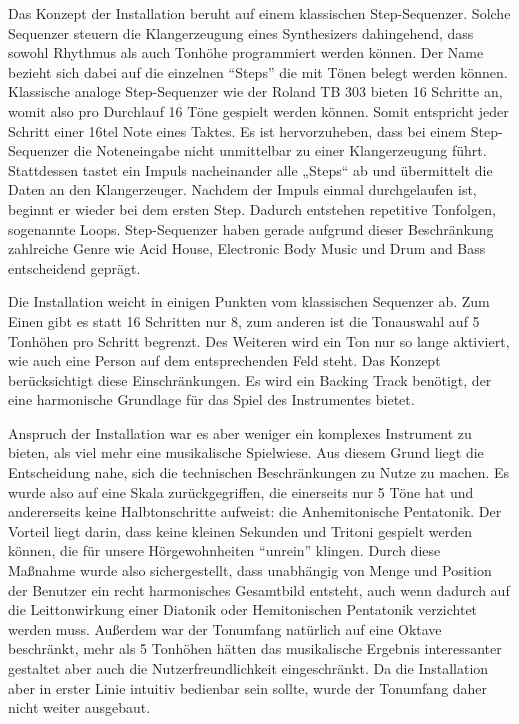 \label{sec:music}

Das Konzept der Installation beruht auf einem klassischen Step-Sequenzer. Solche Sequenzer steuern die Klangerzeugung eines Synthesizers dahingehend, dass sowohl Rhythmus als auch Tonhöhe programmiert werden können. Der Name bezieht sich dabei auf die einzelnen \enquote{Steps} die mit Tönen belegt werden können. Klassische analoge Step-Sequenzer wie der Roland TB 303 bieten 16 Schritte an, womit also pro Durchlauf 16 Töne gespielt werden können. Somit entspricht jeder Schritt einer 16tel Note eines Taktes. Es ist hervorzuheben, dass bei einem Step-Sequenzer die Noteneingabe nicht unmittelbar zu einer Klangerzeugung führt. Stattdessen tastet ein Impuls nacheinander alle „Steps“ ab und übermittelt die Daten an den Klangerzeuger. Nachdem der Impuls einmal durchgelaufen ist, beginnt er wieder bei dem ersten Step. Dadurch entstehen repetitive Tonfolgen, sogenannte Loops. Step-Sequenzer haben gerade aufgrund dieser Beschränkung zahlreiche Genre wie Acid House, Electronic Body Music und Drum and Bass entscheidend geprägt.

Die Installation weicht in einigen Punkten vom klassischen Sequenzer ab. Zum Einen gibt es statt 16 Schritten nur 8, zum anderen ist die Tonauswahl auf 5 Tonhöhen pro Schritt begrenzt. Des Weiteren wird ein Ton nur so lange aktiviert, wie auch eine Person auf dem entsprechenden Feld steht. Das Konzept berücksichtigt diese Einschränkungen. Es wird ein Backing Track benötigt, der eine harmonische Grundlage für das Spiel des Instrumentes bietet.

Anspruch der Installation war es aber weniger ein komplexes Instrument zu bieten, als viel mehr eine musikalische Spielwiese. Aus diesem Grund liegt die Entscheidung nahe, sich die technischen Beschränkungen zu Nutze zu machen. Es wurde also auf eine Skala zurückgegriffen, die einerseits nur 5 Töne hat und andererseits keine Halbtonschritte aufweist: die Anhemitonische Pentatonik. Der Vorteil liegt darin, dass keine kleinen Sekunden und Tritoni gespielt werden können, die für unsere Hörgewohnheiten \enquote{unrein} klingen. Durch diese Maßnahme wurde also sichergestellt, dass unabhängig von Menge und Position der Benutzer ein recht harmonisches Gesamtbild entsteht, auch wenn dadurch auf die Leittonwirkung einer Diatonik oder Hemitonischen Pentatonik verzichtet werden muss. Außerdem war der Tonumfang natürlich auf eine Oktave beschränkt, mehr als 5 Tonhöhen hätten das musikalische Ergebnis interessanter gestaltet aber auch die Nutzerfreundlichkeit eingeschränkt. Da die Installation aber in erster Linie intuitiv bedienbar sein sollte, wurde der Tonumfang daher nicht weiter ausgebaut.


